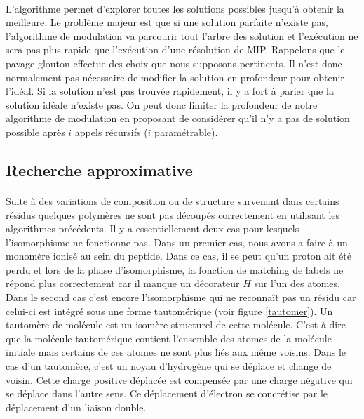 \documentclass[12pt,french,twoside]{report}
\begin{document}
\paragraph{}L'algorithme permet d'explorer toutes les solutions possibles jusqu'à obtenir la meilleure. Le problème majeur
est que si une solution parfaite n'existe pas, l'algorithme de modulation va parcourir tout l'arbre des solution et l'exécution
ne sera pas plus rapide que l'exécution d'une résolution de MIP. Rappelons que le pavage glouton effectue des choix que nous
supposons pertinents. Il n'est donc normalement pas nécessaire de modifier la solution en profondeur pour 
obtenir l'idéal. Si la solution n'est pas trouvée rapidement, il y a fort à parier que la solution idéale n'existe
pas. On peut donc limiter la profondeur de notre algorithme de modulation en proposant de considérer qu'il n'y a pas de solution
possible après $i$ appels récursifs ($i$ paramétrable).


\subsection{Recherche approximative}

\label{light_p}

\paragraph{}Suite à des variations de composition ou de structure survenant dans certains résidus quelques polymères ne sont pas
découpés correctement en utilisant les algorithmes précédents. Il y a essentiellement deux cas pour lesquels l'isomorphisme
ne fonctionne pas. Dans un premier cas, nous avons a faire à un monomère ionisé au sein du peptide. Dans ce cas, il se peut qu'un
proton ait été perdu et lors de la phase d'isomorphisme, la fonction de matching de labels ne répond plus correctement car il
manque un décorateur $H$ sur l'un des atomes. Dans le second cas c'est encore l'isomorphisme qui ne reconnaît pas un résidu car
celui-ci est intégré sous une forme tautomérique (voir figure \ref{tautomer}).
Un tautomère de molécule est un isomère structurel de cette molécule.
C'est à dire que la molécule tautomérique contient l'ensemble des atomes de la molécule initiale  mais certains
de ces atomes ne sont plus liés aux même voisins. Dans le cas d'un tautomère, c'est un noyau d'hydrogène qui se déplace et change
de voisin. Cette charge positive déplacée est compensée par une charge négative qui se déplace dans l'autre sens. Ce déplacement
d'électron se concrétise par le déplacement d'un liaison double.
\end{document}
